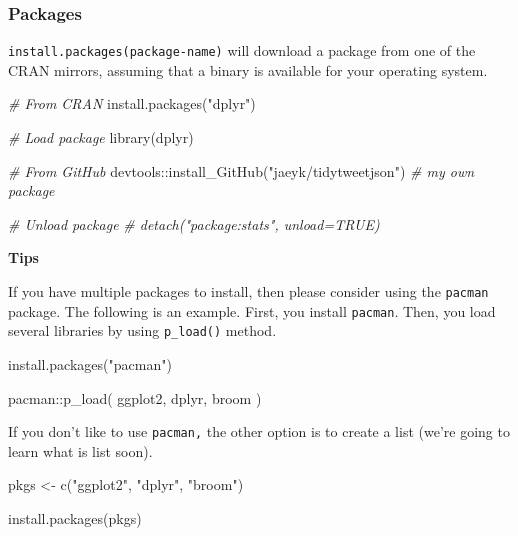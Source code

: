 \documentclass[
]{book}
\newenvironment{Shaded}{\begin{snugshade}}{\end{snugshade}}
\newcommand{\CommentTok}[1]{\textcolor[rgb]{0.56,0.35,0.01}{\textit{#1}}}
\newcommand{\FunctionTok}[1]{\textcolor[rgb]{0.00,0.00,0.00}{#1}}
\newcommand{\NormalTok}[1]{#1}
\newcommand{\OtherTok}[1]{\textcolor[rgb]{0.56,0.35,0.01}{#1}}
\newcommand{\SpecialCharTok}[1]{\textcolor[rgb]{0.00,0.00,0.00}{#1}}
\newcommand{\StringTok}[1]{\textcolor[rgb]{0.31,0.60,0.02}{#1}}
\begin{document}
\hypertarget{packages}{%
\subsubsection{Packages}\label{packages}}

\texttt{install.packages(package-name)} will download a package from one of the CRAN mirrors, assuming that a binary is available for your operating system.

\begin{Shaded}
\begin{Highlighting}[]
\CommentTok{\# From CRAN}
\FunctionTok{install.packages}\NormalTok{(}\StringTok{"dplyr"}\NormalTok{) }

\CommentTok{\# Load package }
\FunctionTok{library}\NormalTok{(dplyr)}

\CommentTok{\# From GitHub }
\NormalTok{devtools}\SpecialCharTok{::}\FunctionTok{install\_GitHub}\NormalTok{(}\StringTok{"jaeyk/tidytweetjson"}\NormalTok{) }\CommentTok{\# my own package }

\CommentTok{\# Unload package }
\CommentTok{\# detach("package:stats", unload=TRUE)}
\end{Highlighting}
\end{Shaded}

\textbf{Tips}

If you have multiple packages to install, then please consider using the \texttt{pacman} package. The following is an example. First, you install \texttt{pacman}. Then, you load several libraries by using \texttt{p\_load()} method.

\begin{Shaded}
\begin{Highlighting}[]
\FunctionTok{install.packages}\NormalTok{(}\StringTok{"pacman"}\NormalTok{)}

\NormalTok{pacman}\SpecialCharTok{::}\FunctionTok{p\_load}\NormalTok{(}
\NormalTok{  ggplot2,}
\NormalTok{  dplyr, }
\NormalTok{  broom}
\NormalTok{)}
\end{Highlighting}
\end{Shaded}

If you don't like to use \texttt{pacman,} the other option is to create a list (we're going to learn what is list soon).

\begin{Shaded}
\begin{Highlighting}[]
\NormalTok{pkgs }\OtherTok{\textless{}{-}} \FunctionTok{c}\NormalTok{(}\StringTok{"ggplot2"}\NormalTok{, }\StringTok{"dplyr"}\NormalTok{, }\StringTok{"broom"}\NormalTok{)}

\FunctionTok{install.packages}\NormalTok{(pkgs)}
\end{Highlighting}
\end{Shaded}
\end{document}
